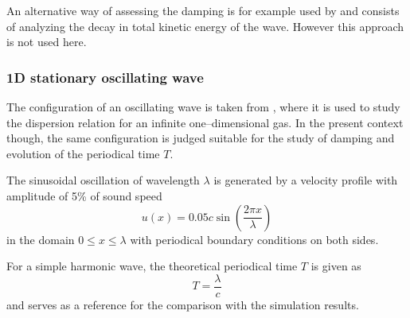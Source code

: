\documentclass{report}
\begin{document}
An alternative way of assessing the damping is for example used by \cite{Attwood2007} and consists of analyzing the decay in total kinetic energy of the wave. However this approach is not used here. 



\subsubsection{1D stationary oscillating wave}
The configuration of an oscillating wave is taken from \cite{Monaghan2005}, where it is used to study the dispersion relation for an infinite one--dimensional gas. In the present context though, the same configuration is judged suitable for the study of damping and evolution of the periodical time $T$.

The sinusoidal oscillation of wavelength $\lambda$ is generated by a velocity profile with amplitude of 5\% of sound speed
\begin{equation}
\label{eq:InitialVelocityPerturbationOscillatingWave}
 u(x)=0.05 c\sin\left(\frac{2\pi x}{\lambda}\right)
\end{equation}
in the domain $0\leq x\leq \lambda$ with periodical boundary conditions on both sides.

For a simple harmonic wave, the theoretical periodical time $T$ is given as \cite{Stewart1930}
\begin{equation}
 T=\frac{\lambda}{c}
\end{equation}
and serves as a reference for the comparison with the simulation results.
\end{document}
